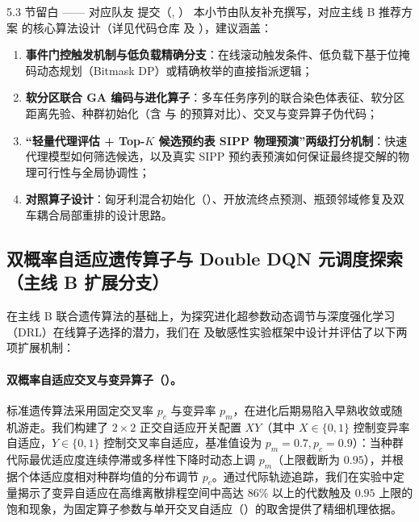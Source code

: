 \begin{teammatebox}{5.3 节留白 —— 对应队友  提交（,  ）}
  本小节由队友补充撰写，对应主线 B 推荐方案  的核心算法设计（详见代码仓库  及 ），建议涵盖：
  \begin{enumerate}
    \item \textbf{事件门控触发机制与低负载精确分支}：在线滚动触发条件、低负载下基于位掩码动态规划（Bitmask DP）或精确枚举的直接指派逻辑；
    \item \textbf{软分区联合 GA 编码与进化算子}：多车任务序列的联合染色体表征、软分区距离先验、种群初始化（含  与  的预算对比）、交叉与变异算子伪代码；
    \item \textbf{“轻量代理评估 + Top-$K$ 候选预约表 SIPP 物理预演”两级打分机制}：快速代理模型如何筛选候选，以及真实 SIPP 预约表预演如何保证最终提交解的物理可行性与全局协调性；
    \item \textbf{对照算子设计}：匈牙利混合初始化（）、开放流终点预测、瓶颈邻域修复及双车耦合局部重排的设计思路。
  \end{enumerate}
\end{teammatebox}

\subsection{双概率自适应遗传算子与 Double DQN 元调度探索（主线 B 扩展分支）}

在主线 B 联合遗传算法的基础上，为探究进化超参数动态调节与深度强化学习（DRL）在线算子选择的潜力，我们在  及敏感性实验框架中设计并评估了以下两项扩展机制：

\paragraph{双概率自适应交叉与变异算子（）。} 标准遗传算法采用固定交叉率 $p_c$ 与变异率 $p_m$，在进化后期易陷入早熟收敛或随机游走。我们构建了 $2\times 2$ 正交自适应开关配置 $XY$（其中 $X \in \{0,1\}$ 控制变异率自适应，$Y \in \{0,1\}$ 控制交叉率自适应，基准值设为 $p_m = 0.7, p_c = 0.9$）：当种群代际最优适应度连续停滞或多样性下降时动态上调 $p_m$（上限截断为 $0.95$），并根据个体适应度相对种群均值的分布调节 $p_c$。通过代际轨迹追踪，我们在实验中定量揭示了变异自适应在高维离散排程空间中高达 $86\%$ 以上的代数触及 $0.95$ 上限的饱和现象，为固定算子参数与单开交叉自适应（）的取舍提供了精细机理依据。

